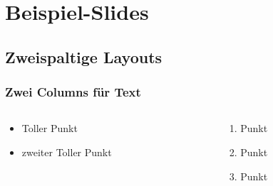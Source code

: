 \documentclass{beamer}
\begin{document}
\section{Beispiel-Slides}
\subsection{Zweispaltige Layouts}
\begin{frame}
    \frametitle{Zwei Columns für Text}
    \begin{columns}[t]
        \begin{column}{0.5\textwidth}
            \begin{itemize}[<+->]
            \item Toller Punkt
            \item zweiter Toller Punkt
        \end{itemize}
        \end{column}
        \begin{column}{0.5\textwidth}
            \begin{enumerate}
                \item Punkt
                \item Punkt
                \item Punkt
            \end{enumerate}
        \end{column}
    \end{columns}
\end{frame}
\end{document}
